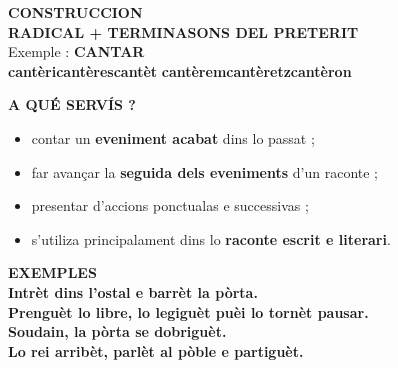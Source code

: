 \documentclass[a4paper,11pt]{article}
\begin{document}
\vspace{2.5mm}\hspace*{6mm}
\begin{minipage}{0.91\textwidth}

\begin{bluebox}
\textbf{\color{BlueDark}CONSTRUCCION}\\[1mm]
\centering
{\Large \textbf{RADICAL + TERMINASONS DEL PRETERIT}}\\[1mm]
\small
Exemple : \textbf{CANTAR}\\[1mm]
\textbf{cantèri}\quad \textbf{cantères}\quad \textbf{cantèt}\quad
\textbf{cantèrem}\quad \textbf{cantèretz}\quad \textbf{cantèron}
\end{bluebox}

\vspace{2.5mm}
\begin{center}
\end{center}

\vspace{1.5mm}
\begin{bluebox}
\textbf{\color{BlueDark}A QUÉ SERVÍS ?}\\[1mm]
\begin{itemize}\setlength{\itemsep}{0.4mm}
\item contar un \textbf{eveniment acabat} dins lo passat ;
\item far avançar la \textbf{seguida dels eveniments} d'un raconte ;
\item presentar d'accions ponctualas e successivas ;
\item s'utiliza principalament dins lo \textbf{raconte escrit e literari}.
\end{itemize}
\end{bluebox}

\vspace{2mm}
\begin{bluebox}
\textbf{\color{BlueDark}EXEMPLES}\\[1mm]
\textbf{Intrèt dins l'ostal e barrèt la pòrta.}\\
\textbf{Prenguèt lo libre, lo legiguèt puèi lo tornèt pausar.}\\
\textbf{Soudain, la pòrta se dobriguèt.}\\
\textbf{Lo rei arribèt, parlèt al pòble e partiguèt.}
\end{bluebox}


\end{minipage}
\end{document}
